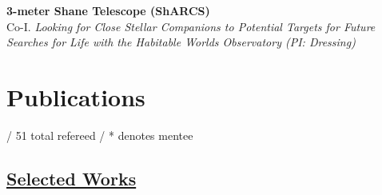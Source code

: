 \documentclass[letterpaper,11pt]{article}
\newcommand{\resumeSubHeadingListStart}{\begin{itemize}[leftmargin=*]}
\newcommand{\shorterSection}[1]{\vspace{-10pt}\section{#1}}
\newcommand{\shortershorterSection}[1]{\vspace{-10pt}\subsection{#1}}
\begin{document}
\begin{list}{}{\cvlist}
     \item[{\color{numcolor}}]\textbf{3-meter Shane Telescope (ShARCS)} \\
     Co-I.  \textit{Looking for Close Stellar Companions to Potential Targets for Future Searches for Life with the Habitable Worlds Observatory (PI: Dressing)}\\



     
  
  \end{list}

  \shorterSection{Publications}
 / 51 total refereed / * denotes mentee
\shortershorterSection{\underline{Selected Works}}
\small
\begin{list}{}{\cvlist}
    
  \end{list}





  
\end{document}
